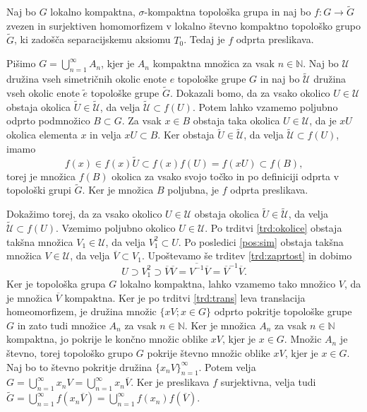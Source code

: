 \documentclass[mat1]{fmfdelo}
\newcommand{\N}{\mathbb N}
\newcommand{\Ucurl}{\mathcal{U}}
\newcommand{\closure}[1]{\overline{#1}}
\begin{document}
\begin{trditev}\label{trd:kompodp}
Naj bo $G$ lokalno kompaktna, $\sigma$-kompaktna topološka grupa in naj bo $f\colon G \to \widetilde{G}$ zvezen in surjektiven homomorfizem v lokalno števno kompaktno topološko grupo $\widetilde{G}$, ki zadošča separacijskemu aksiomu $T_0$. Tedaj je $f$ odprta preslikava.
\end{trditev}

\begin{dokaz}
Pišimo $G = \bigcup_{n=1}^\infty A_n$, kjer je $A_n$ kompaktna množica za vsak $n \in \N$. Naj bo $\Ucurl$ družina vseh simetričnih okolic enote $e$ topološke grupe $G$ in naj bo $\widetilde{\Ucurl}$ družina vseh okolic enote $\tilde{e}$ topološke grupe $\widetilde{G}$. Dokazali bomo, da za vsako okolico $U \in \Ucurl$ obstaja okolica $\widetilde{U} \in \widetilde{\Ucurl}$, da velja $\widetilde{\Ucurl} \subset f(U)$. Potem lahko vzamemo poljubno odprto podmnožico $B \subset G$. Za vsak $x \in B$ obstaja taka okolica $U \in \Ucurl$, da je $xU$ okolica elementa $x$ in velja $xU \subset B$. Ker obstaja $\widetilde{U} \in \widetilde{\Ucurl}$, da velja $\widetilde{\Ucurl} \subset f(U)$, imamo
\[ f(x) \in f(x)\widetilde{U} \subset f(x)f(U) = f(xU) \subset f(B), \]
torej je množica $f(B)$ okolica za vsako svojo točko in po definiciji odprta v topološki grupi $\widetilde{G}$. Ker je množica $B$ poljubna, je $f$ odprta preslikava.

Dokažimo torej, da za vsako okolico $U \in \Ucurl$ obstaja okolica $\widetilde{U} \in \widetilde{\Ucurl}$, da velja $\widetilde{\Ucurl} \subset f(U)$. Vzemimo poljubno okolico $U \in \Ucurl$. Po trditvi \ref{trd:okolice} obstaja takšna množica $V_1 \in \Ucurl$, da velja $V_1^2 \subset U$. Po posledici \ref{pos:sim} obstaja takšna množica $V \in \Ucurl$, da velja $\closure{V} \subset V_1$. Upoštevamo še trditev \ref{trd:zaprtost} in dobimo
\[ U \supset V_1^2 \supset \closure{V}\closure{V} = \closure{V^{-1}}\closure{V} = \closure{V}^{-1}\closure{V}. \]
Ker je topološka grupa $G$ lokalno kompaktna, lahko vzamemo tako množico $V$, da je množica $\closure{V}$ kompaktna.
Ker je po trditvi \ref{trd:trans} leva translacija homeomorfizem, je družina množic $\lbrace xV ; x \in G \rbrace$ odprto pokritje topološke grupe $G$ in zato tudi množice $A_n$ za vsak $n \in \N$. Ker je množica $A_n$ za vsak $n \in \N$ kompaktna, jo pokrije le končno množic oblike $xV$, kjer je $x \in G$. Množic $A_n$ je števno, torej topološko grupo $G$ pokrije števno množic oblike $xV$, kjer je $x \in G$. Naj bo to števno pokritje družina $\lbrace x_nV \rbrace_{n=1}^\infty$. Potem velja $G = \bigcup_{n=1}^\infty x_nV = \bigcup_{n=1}^\infty x_n\closure{V}$. Ker je preslikava $f$ surjektivna, velja tudi $\widetilde{G} = \bigcup_{n=1}^\infty f(x_n\closure{V}) = \bigcup_{n=1}^\infty f(x_n)f(\closure{V})$.


\end{dokaz}
\end{document}
